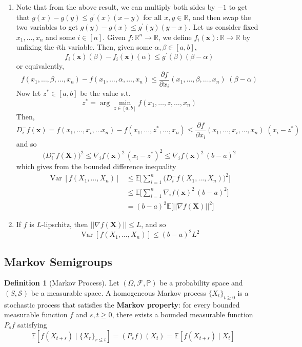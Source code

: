 \documentclass{article}
\DeclareMathOperator{\Var}{Var}
\theoremstyle{definition}
\theoremstyle{remark}
\theoremstyle{definition}
\newtheorem{definition}{Definition}[section]
\begin{document}
\begin{solution}
\begin{enumerate}
      \item Note that from the above result, we can multiply both sides by $-1$ to get that $g(x) - g(y) \leq g^\prime (x) (x - y)$ for all $x, y \in \mathbb{R}$, and then swap the two variables to get $g(y) - g(x) \leq g^\prime (y) (y - x)$. Let us consider fixed $x_1, \ldots, x_n$ and some $i \in [n]$. Given $f: \mathbb{R}^n \rightarrow \mathbb{R}$, we define $f_i (\mathbf{x}): \mathbb{R} \rightarrow \mathbb{R}$ by unfixing the $i$th variable. Then, given some $\alpha, \beta \in [a, b]$, 
      \[f_i (\mathbf{x}) (\beta) - f_i (\mathbf{x}) (\alpha) \leq g^\prime (\beta) (\beta - \alpha)\]
      or equivalently, 
      \[f(x_1, \ldots, \beta, \ldots, x_n) - f(x_1, \ldots, \alpha, \ldots, x_n) \leq \frac{\partial f}{\partial x_i} (x_1, \ldots, \beta, \ldots, x_n) \; (\beta - \alpha)\]
      Now let $z^\ast \in [a, b]$ be the value s.t. 
      \[z^\ast = \arg \min_{z \in [a, b]} f(x_1, \ldots, z, \ldots, x_n) \]
      Then, 
      \[D_i^- f(\mathbf{x}) = f(x_1, \ldots, x_i, \ldots x_n) - f(x_1, \ldots, z^\ast, \ldots, x_n) \leq \frac{\partial f}{\partial x_i} (x_1, \ldots, x_i, \ldots, x_n) \; (x_i - z^\ast)\]
      and so 
      \[\big( D_i^- f(\mathbf{X}) \big)^2 \leq \nabla_i f (\mathbf{x})^2 \, (x_i - z^\ast)^2 \leq \nabla_i f (\mathbf{x})^2 \, (b - a)^2\]
      which gives from the bounded difference inequality 
      \begin{align*}
          \Var[f(X_1, \ldots, X_n)] & \leq \mathbb{E} \bigg[ \sum_{i=1}^n \big( D_i^- f(X_1, \ldots, X_n) \big)^2 \bigg] \\
          & \leq \mathbb{E} \bigg[ \sum_{i=1}^n \nabla_i f (\mathbf{x})^2 \, (b - a)^2 \bigg] \\
          & = (b - a)^2 \mathbb{E} \big[ \big| \big| \nabla f(\mathbf{X})\big| \big|^2 \big]
      \end{align*}
      
      \item If $f$ is $L$-lipschitz, then $||\nabla f(\mathbf{X})|| \leq L$, and so  
      \[\Var[f(X_1, \ldots, X_n)] \leq (b - a)^2 L^2\]
  \end{enumerate}
  \end{solution}

  \subsection{Markov Semigroups}

  \begin{definition}[Markov Process]
  Let $(\Omega, \mathcal{F}, \mathbb{P})$ be a probability space and $(S, \mathcal{S})$ be a measurable space. A homogeneous Markov process $\{X_t\}_{t \geq 0}$ is a stochastic process that satisfies the \textbf{Markov property}: for every bounded measurable function $f$ and $s, t \geq 0$, there exists a bounded measurable function $P_s f$ satisfying 
  \[\mathbb{E}[f (X_{t + s}) \mid \{X_r\}_{r \leq t}] = (P_s f) (X_t) = \mathbb{E}[ f(X_{t + s}) \mid X_t]\]
  \end{definition}
\end{document}
